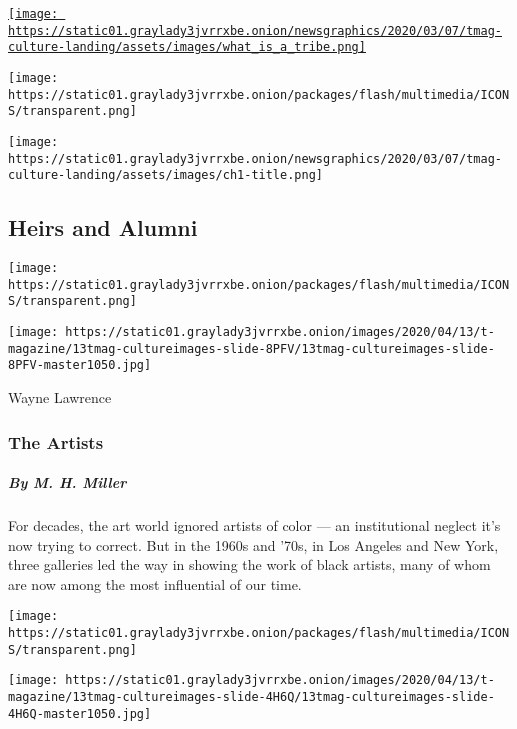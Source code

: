 \href{https://www.nytimes3xbfgragh.onion/interactive/2020/04/13/t-magazine/tribe-meaning.html}{\texttt{[image: https://static01.graylady3jvrrxbe.onion/newsgraphics/2020/03/07/tmag-culture-landing/assets/images/what\_is\_a\_tribe.png]}}

\texttt{[image: https://static01.graylady3jvrrxbe.onion/packages/flash/multimedia/ICONS/transparent.png]}

\texttt{[image: https://static01.graylady3jvrrxbe.onion/newsgraphics/2020/03/07/tmag-culture-landing/assets/images/ch1-title.png]}

\hypertarget{heirs-and-alumni}{%
\subsection{Heirs and Alumni}\label{heirs-and-alumni}}

\href{https://www.nytimes3xbfgragh.onion/interactive/2020/04/13/t-magazine/black-art-galleries.html}{}

\texttt{[image: https://static01.graylady3jvrrxbe.onion/packages/flash/multimedia/ICONS/transparent.png]}

\texttt{[image: https://static01.graylady3jvrrxbe.onion/images/2020/04/13/t-magazine/13tmag-cultureimages-slide-8PFV/13tmag-cultureimages-slide-8PFV-master1050.jpg]}

Wayne Lawrence

\hypertarget{the-artists}{%
\subsubsection{The Artists}\label{the-artists}}

\hypertarget{by-m-h-miller}{%
\subparagraph{By M. H. Miller}\label{by-m-h-miller}}

For decades, the art world ignored artists of color --- an institutional
neglect it's now trying to correct. But in the 1960s and '70s, in Los
Angeles and New York, three galleries led the way in showing the work of
black artists, many of whom are now among the most influential of our
time.

\href{https://www.nytimes3xbfgragh.onion/interactive/2020/04/13/t-magazine/italian-fashion-design-houses.html}{}

\texttt{[image: https://static01.graylady3jvrrxbe.onion/packages/flash/multimedia/ICONS/transparent.png]}

\texttt{[image: https://static01.graylady3jvrrxbe.onion/images/2020/04/13/t-magazine/13tmag-cultureimages-slide-4H6Q/13tmag-cultureimages-slide-4H6Q-master1050.jpg]}


